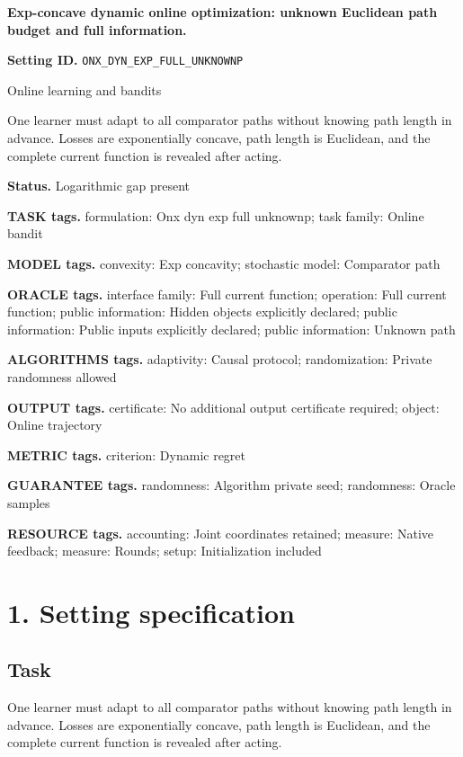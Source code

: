 \documentclass[10pt,a4paper]{article}
\begin{document}
\raggedright

{\LARGE\bfseries\sffamily\color{AtlasNavy} Exp-concave dynamic online optimization: unknown Euclidean path budget and full information.\par}\vspace{5pt}
\textbf{Setting ID.} \texttt{ONX\_\allowbreak{}DYN\_\allowbreak{}EXP\_\allowbreak{}FULL\_\allowbreak{}UNKNOWNP}

Online learning and bandits

One learner must adapt to all comparator paths without knowing path length in advance. Losses are exponentially concave, path length is Euclidean, and the complete current function is revealed after acting.

\textbf{Status.} Logarithmic gap present

\textbf{TASK tags.} formulation: Onx dyn exp full unknownp; task family: Online bandit

\textbf{MODEL tags.} convexity: Exp concavity; stochastic model: Comparator path

\textbf{ORACLE tags.} interface family: Full current function; operation: Full current function; public information: Hidden objects explicitly declared; public information: Public inputs explicitly declared; public information: Unknown path

\textbf{ALGORITHMS tags.} adaptivity: Causal protocol; randomization: Private randomness allowed

\textbf{OUTPUT tags.} certificate: No additional output certificate required; object: Online trajectory

\textbf{METRIC tags.} criterion: Dynamic regret

\textbf{GUARANTEE tags.} randomness: Algorithm private seed; randomness: Oracle samples

\textbf{RESOURCE tags.} accounting: Joint coordinates retained; measure: Native feedback; measure: Rounds; setup: Initialization included

\section{1. Setting specification}
\subsection{Task}
One learner must adapt to all comparator paths without knowing path length in advance. Losses are exponentially concave, path length is Euclidean, and the complete current function is revealed after acting.
\end{document}
